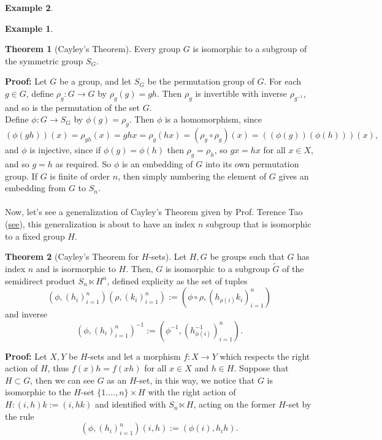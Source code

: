 \documentclass[11pt]{amsbook}%
\theoremstyle{plain}
\theoremstyle{definition}
\newtheorem*{example*}{Example}
\newtheorem{theorem}{Theorem}
\numberwithin{equation}{section}
\renewcommand{\proof}{ \textbf{Proof: }}
\begin{document}
\begin{example*}
\begin{example*}
\begin{theorem}[Cayley's Theorem]
  Every group $G$ is isomorphic to a subgroup of the symmetric group $S_{G}$.
\end{theorem} \vspace{1.8em}
\proof Let $G$ be a group, and let $S_{G}$ be the permutation group of $G$. For each $g \in G$,
define $\rho_{g}: G \longrightarrow G$ by $\rho_{g}(g) = gh$. Then $\rho_{g}$ is invertible
with inverse $\rho_{g^{-1}}$, and so is the permutation of the set $G$. \\
Define $\phi: G \longrightarrow S_{G}$ by $\phi(g) = \rho_{g}$. Then $\phi$ is a
homomorphism, since
$$
(\phi(gh))(x) = \rho_{gh}(x) = ghx = \rho_{g}(hx) = (\rho_{g} \circ \rho_{g})(x) =  ((\phi(g))(\phi(h)))(x),
$$
and $\phi$ is injective, since if $\phi(g) = \phi(h)$ then $\rho_{g} = \rho_{h}$, so 
$gx = hx$ for all $x \in X$, and so $g = h$ as required. So $\phi$ is 
an embedding of $G$ into its own permutation group. If $G$ is finite of order $n$, then
simply numbering the element of $G$ gives an embedding from $G$ to $S_{n}$. \qedsymbol \\ \\
Now, let's see a generalization of Cayley's Theorem given by Prof. Terence Tao (\href{https://terrytao.wordpress.com/2014/10/06/a-trivial-generalisation-of-cayleys-theorem/}{see}), this generalization is about to have an index $n$ subgroup that is isomorphic to a fixed group $H$.

\begin{theorem}[Cayley's Theorem for $H$-sets]
  Let $H, G$ be groups such that $G$ has index $n$ and is isormorphic to $H$.
  Then, $G$ is isomorphic to a subgroup ${\tilde G}$ of the semidirect product $S_{n} \ltimes H^{n}$,
  defined explicity as the set of tuples 
  $$
  (\phi, (h_{i})_{i=1}^{n})(\rho, (k_{i})_{i=1}^{n}) := (\phi \circ \rho, (h_{\rho(i)}k_{i})_{i=1}^{n})
  $$
  and inverse
  $$
  (\phi, (h_{i})_{i=1}^{n})^{-1} := (\phi^{-1}, (h_{\phi(i)}^{-1})_{i=1}^{n}).
  $$

\end{theorem} \vspace{1.8em}
\proof Let $X, Y$ be $H$-sets and let a morphism $f: X \longrightarrow Y$ which
respects the right action of $H$, thus $f(x)h = f(xh)$ for all $x \in X$ and $h \in H$.
Suppose that $H \subset G$, then we can see $G$ as an $H$-set, in this way,
we notice that $G$ is isomorphic to the $H$-set $\{1. \dots, n\} \times H$ with the
right action of $H:(i, h)k := (i, hk)$ and identified with $S_{n} \ltimes H$, acting
on the former $H$-set by the rule
$$
(\phi, (h_{i})_{i=1}^{n})(i, h) := (\phi(i), h_{i}h).
$$
\qedsymbol


\end{example*}
\end{example*}
\end{document}
